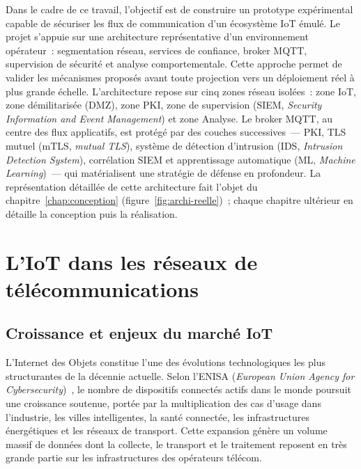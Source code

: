 Dans le cadre de ce travail, l'objectif est de construire un prototype expérimental capable de sécuriser les flux de communication d'un écosystème IoT émulé. Le projet s'appuie sur une architecture représentative d'un environnement opérateur~: segmentation réseau, services de confiance, broker MQTT, supervision de sécurité et analyse comportementale. Cette approche permet de valider les mécanismes proposés avant toute projection vers un déploiement réel à plus grande échelle. L'architecture repose sur cinq zones réseau isolées~: zone IoT, zone démilitarisée (DMZ), zone PKI, zone de supervision (SIEM, \emph{Security Information and Event Management}) et zone Analyse. Le broker MQTT, au centre des flux applicatifs, est protégé par des couches successives~--- PKI, TLS mutuel (mTLS, \emph{mutual TLS}), système de détection d'intrusion (IDS, \emph{Intrusion Detection System}), corrélation SIEM et apprentissage automatique (ML, \emph{Machine Learning})~--- qui matérialisent une stratégie de défense en profondeur. La représentation détaillée de cette architecture fait l'objet du chapitre~\ref{chap:conception} (figure~\ref{fig:archi-reelle})~; chaque chapitre ultérieur en détaille la conception puis la réalisation.

\section{L'IoT dans les réseaux de télécommunications}
\label{sec:iot-telecom}

\subsection{Croissance et enjeux du marché IoT}

L'Internet des Objets constitue l'une des évolutions technologiques les plus structurantes de la décennie actuelle. Selon l'ENISA (\emph{European Union Agency for Cybersecurity})~\cite{enisa_iot}, le nombre de dispositifs connectés actifs dans le monde poursuit une croissance soutenue, portée par la multiplication des cas d'usage dans l'industrie, les villes intelligentes, la santé connectée, les infrastructures énergétiques et les réseaux de transport. Cette expansion génère un volume massif de données dont la collecte, le transport et le traitement reposent en très grande partie sur les infrastructures des opérateurs télécom.

